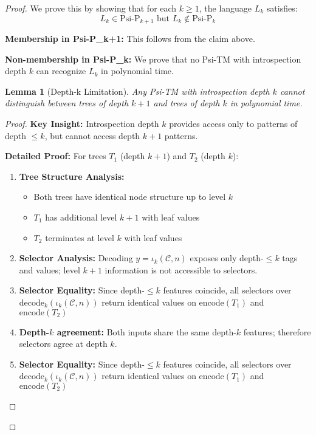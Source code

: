 \documentclass[11pt]{article}
\newtheorem{lemma}{Lemma}
\begin{document}
\begin{proof}
We prove this by showing that for each $k \geq 1$, the language $L_k$ satisfies:
$$L_k \in \text{Psi-P}_{k+1} \text{ but } L_k \notin \text{Psi-P}_k$$

\textbf{Membership in Psi-P_{k+1}:}
This follows from the claim above.

\textbf{Non-membership in Psi-P_k:}
We prove that no Psi-TM with introspection depth $k$ can recognize $L_k$ in polynomial time.

\begin{lemma}[Depth-k Limitation]
\label{lem:depth-k-limitation}
Any Psi-TM with introspection depth $k$ cannot distinguish between trees of depth $k+1$ and trees of depth $k$ in polynomial time.
\end{lemma}

\begin{proof}
\textbf{Key Insight:} Introspection depth $k$ provides access only to patterns of depth $\leq k$, but cannot access depth $k+1$ patterns.

\textbf{Detailed Proof:}
For trees $T_1$ (depth $k+1$) and $T_2$ (depth $k$):

\begin{enumerate}
\item \textbf{Tree Structure Analysis:}
  \begin{itemize}
  \item Both trees have identical node structure up to level $k$
  \item $T_1$ has additional level $k+1$ with leaf values
  \item $T_2$ terminates at level $k$ with leaf values
  \end{itemize}

\item \textbf{Selector Analysis:}
  Decoding $y=\iota_k(\mathcal{C},n)$ exposes only depth-$\le k$ tags and values; level $k{+}1$ information is not accessible to selectors.

\item \textbf{Selector Equality:}
  Since depth-$\le k$ features coincide, all selectors over $\mathrm{decode}_k(\iota_k(\mathcal{C},n))$ return identical values on $\text{encode}(T_1)$ and $\text{encode}(T_2)$

\item \textbf{Depth-$k$ agreement:}
  Both inputs share the same depth-$k$ features; therefore selectors agree at depth $k$.

\item \textbf{Selector Equality:}
  Since depth-$\le k$ features coincide, all selectors over $\mathrm{decode}_k(\iota_k(\mathcal{C},n))$ return identical values on $\text{encode}(T_1)$ and $\text{encode}(T_2)$


\end{enumerate}
\end{proof}
\end{proof}
\end{document}
